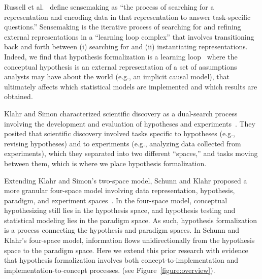 Russell et al.~\cite{russell1993cost} define sensemaking as ``the process of
searching for a representation and encoding data in that representation to
answer task-specific questions.'' Sensemaking is the iterative process of
searching for and refining external representations in a ``learning loop
complex'' that involves transitioning back and forth between (i) searching for
and (ii) instantiating representations.
Indeed, we find that hypothesis formalization is a learning
loop~\cite{russell1993cost} where the conceptual hypothesis is an external
representation of a set of assumptions analysts may have about the world (e.g.,
an implicit causal model), that ultimately affects which statistical models are
implemented and which results are obtained. 

Klahr and Simon characterized scientific discovery as a dual-search process
involving the development and evaluation of hypotheses and
experiments~\cite{klahr1988dual}. They posited that scientific
discovery involved tasks specific to hypotheses (e.g., revising hypotheses) and
to experiments (e.g., analyzing data collected from experiments), which they
separated into two different ``spaces,'' and tasks moving between them, which is
where we place hypothesis formalization.

Extending Klahr and Simon's two-space model, Schunn and Klahr proposed a more
granular four-space model involving data representation, hypothesis, paradigm,
and experiment spaces~\cite{schunn1995FourSpace,schunn1996BeyondTwoSpace}. In the four-space model, conceptual hypothesizing still lies in the
hypothesis space, and hypothesis testing and statistical modeling lies in the
paradigm space. As such, hypothesis formalization is a process connecting
the hypothesis and paradigm spaces. In Schunn and Klahr's four-space model,
information flows unidirectionally from the hypothesis space to the paradigm space.
Here we extend this prior research with
evidence that hypothesis formalization involves both
concept-to-implementation and implementation-to-concept processes. (see
Figure~\ref{figure:overview}).

